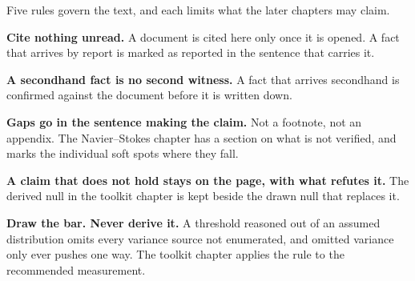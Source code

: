 Five rules govern the text, and each limits what the later chapters may claim.

\textbf{Cite nothing unread.} A document is cited here only once it is opened. A fact that arrives by
report is marked as reported in the sentence that carries it.

\textbf{A secondhand fact is no second witness.} A fact that arrives secondhand is confirmed against
the document before it is written down.

\textbf{Gaps go in the sentence making the claim.} Not a footnote, not an appendix. The
Navier--Stokes chapter has a section on what is not verified, and marks the individual soft spots
where they fall.

\textbf{A claim that does not hold stays on the page, with what refutes it.} The derived null in the
toolkit chapter is kept beside the drawn null that replaces it.

\textbf{Draw the bar. Never derive it.} A threshold reasoned out of an assumed distribution omits
every variance source not enumerated, and omitted variance only ever pushes one way. The toolkit
chapter applies the rule to the recommended measurement.
